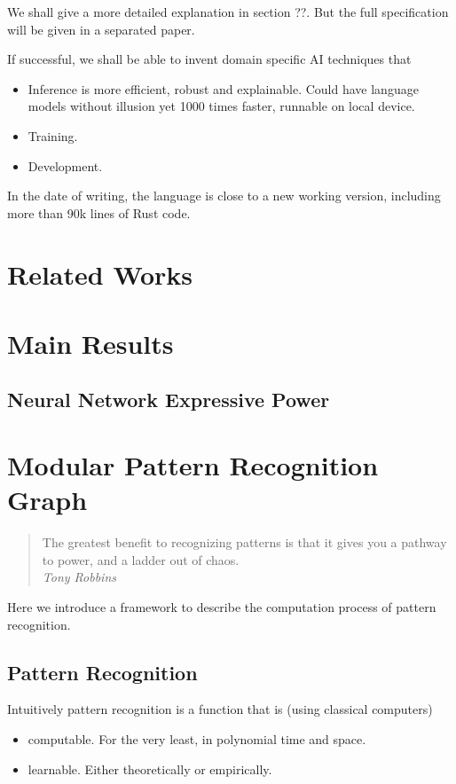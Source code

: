 \documentclass[11pt, oneside]{article}   	%
\theoremstyle{definition}
\begin{document}
We shall give a more detailed explanation in section ??. But the full specification will be given in a separated paper.

If successful, we shall be able to invent domain specific AI techniques that 

\begin{itemize}
	\item Inference is more efficient, robust and explainable. Could have language models without illusion yet 1000 times faster, runnable on local device.
	\item Training.
	\item Development.
\end{itemize}
 In the date of writing, the language is close to a new working version, including more than 90k lines of Rust code.

\section{Related Works}

\section{Main Results}

\subsection{Neural Network Expressive Power}


\section{Modular Pattern Recognition Graph}

\begin{quote}
The greatest benefit to recognizing patterns is that it gives you a pathway to power, and a ladder out of chaos. \\
\emph{Tony Robbins}
\end{quote}


Here we introduce a framework to describe the computation process of pattern recognition.

\subsection{Pattern Recognition}

Intuitively pattern recognition is a function that is (using classical computers)
\begin{itemize}
	\item computable. For the very least, in polynomial time and space.
	\item learnable. Either theoretically or empirically.
\end{itemize}
\end{document}
